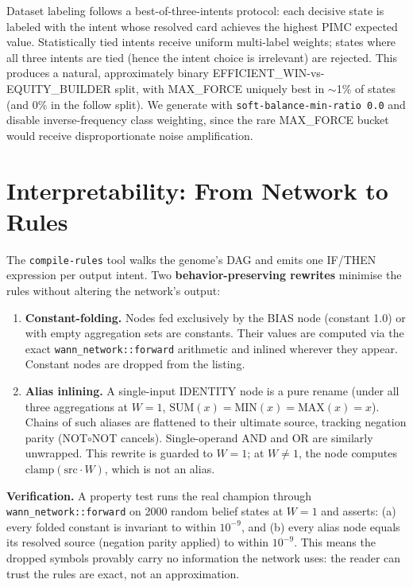 \documentclass[runningheads]{llncs}
\begin{document}
Dataset labeling follows a best-of-three-intents protocol: each decisive state
is labeled with the intent whose resolved card achieves the highest PIMC
expected value. Statistically tied intents receive uniform multi-label weights;
states where all three intents are tied (hence the intent choice is irrelevant)
are rejected. This produces a natural, approximately binary
EFFICIENT\_WIN-vs-EQUITY\_BUILDER split, with MAX\_FORCE uniquely best in
$\sim$1\% of states (and 0\% in the follow split). We generate with
\texttt{soft-balance-min-ratio 0.0} and disable inverse-frequency class
weighting, since the rare MAX\_FORCE bucket would receive disproportionate
noise amplification.

\section{Interpretability: From Network to Rules}

The \texttt{compile-rules} tool walks the genome's DAG and emits one IF/THEN
expression per output intent. Two \textbf{behavior-preserving rewrites}
minimise the rules without altering the network's output:

\begin{enumerate}
\item \textbf{Constant-folding.} Nodes fed exclusively by the BIAS node (constant
  1.0) or with empty aggregation sets are constants. Their values are computed
  via the exact \texttt{wann\_network::forward} arithmetic and inlined wherever
  they appear. Constant nodes are dropped from the listing.
\item \textbf{Alias inlining.} A single-input IDENTITY node is a pure rename
  (under all three aggregations at $W{=}1$, $\text{SUM}(x) = \text{MIN}(x) =
  \text{MAX}(x) = x$). Chains of such aliases are flattened to their ultimate
  source, tracking negation parity (NOT$\circ$NOT cancels). Single-operand AND
  and OR are similarly unwrapped. This rewrite is guarded to $W=1$; at $W \neq
  1$, the node computes $\text{clamp}(\text{src} \cdot W)$, which is not an
  alias.
\end{enumerate}

\textbf{Verification.} A property test runs the real champion through
\texttt{wann\_network::forward} on 2000 random belief states at $W{=}1$ and
asserts: (a) every folded constant is invariant to within $10^{-9}$, and
(b) every alias node equals its resolved source (negation parity applied) to
within $10^{-9}$. This means the dropped symbols provably carry no information
the network uses: the reader can trust the rules are exact, not an
approximation.
\end{document}
